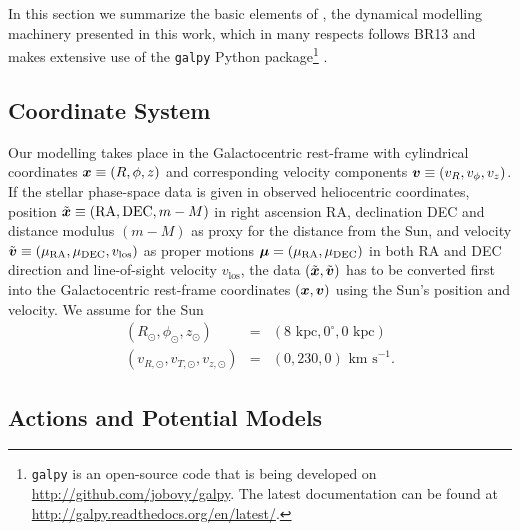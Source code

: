 

In this section we summarize the basic elements of \RM{}, the dynamical modelling machinery presented in this work, which in many respects follows BR13 and makes extensive use of the \texttt{galpy} Python package\footnote{\texttt{galpy} is an open-source code that is being developed on \url{http://github.com/jobovy/galpy}. The latest documentation can be found at \url{http://galpy.readthedocs.org/en/latest/}.} \citep{2015ApJS..216...29B}.

\subsection{Coordinate System} \label{sec:coordinates}

Our modelling takes place in the Galactocentric rest-frame with cylindrical coordinates $\boldsymbol{x} \equiv (R,\phi,z)$ and corresponding velocity components $\boldsymbol{v} \equiv (v_R,v_\phi,v_z)$. If the stellar phase-space data is given in observed heliocentric coordinates, position $\tilde{\boldsymbol{x}} \equiv(\text{RA},\text{DEC},m-M)$ in right ascension RA, declination DEC and distance modulus $(m-M)$ as proxy for the distance from the Sun, and velocity $\tilde{\boldsymbol{v}} \equiv (\mu_\text{RA},\mu_\text{DEC},v_\text{los})$ as proper motions $\boldsymbol{\mu}=(\mu_\text{RA},\mu_\text{DEC})$  in both RA and DEC direction and line-of-sight velocity $v_\text{los}$, the data $(\tilde{\boldsymbol{x}},\tilde{\boldsymbol{v}})$ has to be converted first into the Galactocentric rest-frame coordinates $(\boldsymbol{x},\boldsymbol{v})$ using the Sun's position and velocity. We assume for the Sun
\begin{eqnarray*}
(R_\odot,\phi_\odot,z_\odot) &=&(8 \text{ kpc}, 0^\circ, 0 \text{ kpc})\\
(v_{R,\odot},v_{T,\odot},v_{z,\odot}) &=& (0,230,0) \text{ km s}^{-1}.
\end{eqnarray*}

\subsection{Actions and Potential Models}  \label{sec:potentials}

